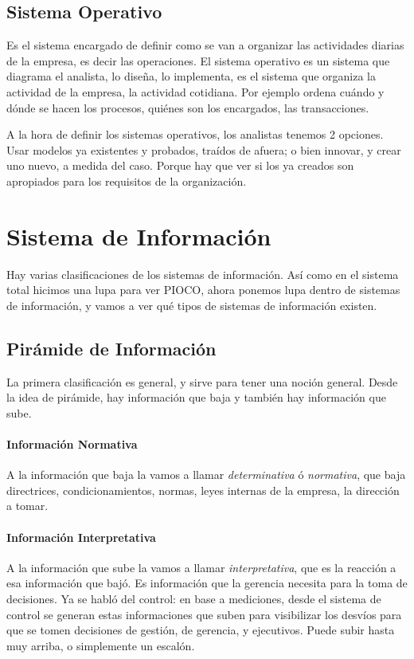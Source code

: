 \hypertarget{sistema-operativo}{%
\subsection{Sistema Operativo}\label{sistema-operativo}}

Es el sistema encargado de definir como se van a organizar las
actividades diarias de la empresa, es decir las operaciones. El sistema
operativo es un sistema que diagrama el analista, lo diseña, lo
implementa, es el sistema que organiza la actividad de la empresa, la
actividad cotidiana. Por ejemplo ordena cuándo y dónde se hacen los
procesos, quiénes son los encargados, las transacciones.

A la hora de definir los sistemas operativos, los analistas tenemos 2
opciones. Usar modelos ya existentes y probados, traídos de afuera; o
bien innovar, y crear uno nuevo, a medida del caso. Porque hay que ver
si los ya creados son apropiados para los requisitos de la organización.

\hypertarget{sistema-de-informaciuxf3n}{%
\section{Sistema de Información}\label{sistema-de-informaciuxf3n}}

Hay varias clasificaciones de los sistemas de información. Así como en
el sistema total hicimos una lupa para ver PIOCO, ahora ponemos lupa
dentro de sistemas de información, y vamos a ver qué tipos de sistemas
de información existen.

\hypertarget{piruxe1mide-de-informaciuxf3n}{%
\subsection{Pirámide de
Información}\label{piruxe1mide-de-informaciuxf3n}}

La primera clasificación es general, y sirve para tener una noción
general. Desde la idea de pirámide, hay información que baja y también
hay información que sube. 
\paragraph{Información Normativa}
A la información que baja la vamos a llamar
\emph{determinativa} ó \emph{normativa}, que baja directrices,
condicionamientos, normas, leyes internas de la empresa, la dirección a
tomar. 
\paragraph{Información Interpretativa}
A la información que sube la vamos a llamar
\emph{interpretativa}, que es la reacción a esa información que bajó. Es
información que la gerencia necesita para la toma de decisiones. Ya se
habló del control: en base a mediciones, desde el sistema de control se
generan estas informaciones que suben para visibilizar los desvíos para
que se tomen decisiones de gestión, de gerencia, y ejecutivos. Puede
subir hasta muy arriba, o simplemente un escalón. 

